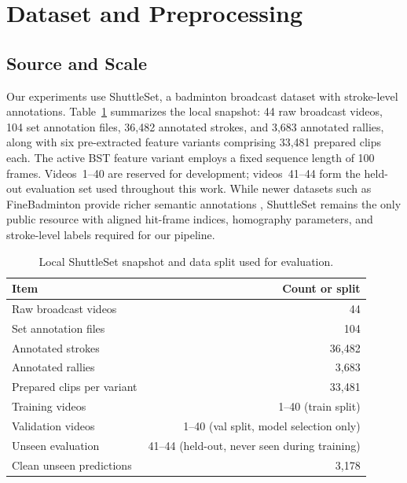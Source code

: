 \section{Dataset and Preprocessing}

\subsection{Source and Scale}

Our experiments use ShuttleSet, a badminton broadcast dataset with stroke-level
annotations. Table~\ref{tab:data} summarizes the local snapshot: 44 raw
broadcast videos, 104 set annotation files, 36{,}482 annotated strokes, and
3{,}683 annotated rallies, along with six pre-extracted feature variants
comprising 33{,}481 prepared clips each. The active BST feature variant employs
a fixed sequence length of 100 frames. Videos~1--40 are reserved for
development; videos~41--44 form the held-out evaluation set used throughout
this work. While newer datasets such as FineBadminton provide richer semantic
annotations \cite{finebadminton}, ShuttleSet remains the only public resource
with aligned hit-frame indices, homography parameters, and stroke-level labels
required for our pipeline.

\begin{table}[t]
  \caption{Local ShuttleSet snapshot and data split used for evaluation.}
  \label{tab:data}
  \centering
  \small
  \begin{tabular}{lr}
    \toprule
    Item & Count or split \\
    \midrule
    Raw broadcast videos & 44 \\
    Set annotation files & 104 \\
    Annotated strokes    & 36{,}482 \\
    Annotated rallies    & 3{,}683 \\
    Prepared clips per variant & 33{,}481 \\
    Training videos      & 1--40 (train split) \\
    Validation videos    & 1--40 (val split, model selection only) \\
    Unseen evaluation    & 41--44 (held-out, never seen during training) \\
    Clean unseen predictions & 3{,}178 \\
    \bottomrule
  \end{tabular}
\end{table}

